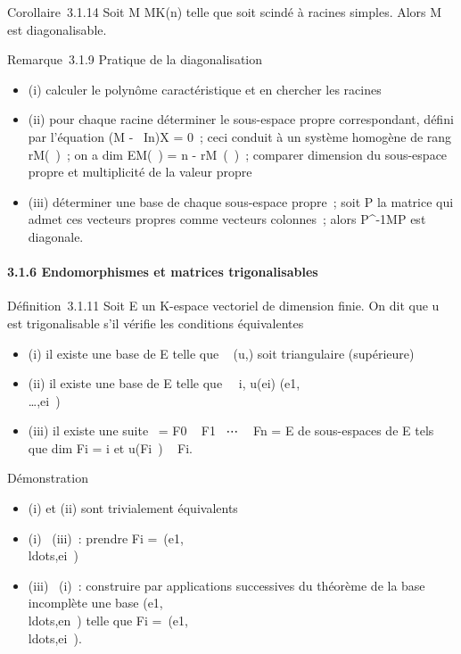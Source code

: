 Corollaire~3.1.14 Soit M \in MK(n) telle que \chiM soit
scindé à racines simples. Alors M est diagonalisable.

Remarque~3.1.9 Pratique de la diagonalisation

\begin{itemize}
\itemsep1pt\parskip0pt
\item
  (i) calculer le polynôme caractéristique et en chercher les racines
\item
  (ii) pour chaque racine déterminer le sous-espace propre
  correspondant, défini par l'équation (M - \lambda~In)X = 0~; ceci
  conduit à un système homogène de rang rM(\lambda~)~; on a
  dim EM(\lambda~) = n - rM~(\lambda~)~;
  comparer dimension du sous-espace propre et multiplicité de la valeur
  propre
\item
  (iii) déterminer une base de chaque sous-espace propre~; soit P la
  matrice qui admet ces vecteurs propres comme vecteurs colonnes~; alors
  P^-1MP est diagonale.
\end{itemize}

\paragraph{3.1.6 Endomorphismes et matrices trigonalisables}

Définition~3.1.11 Soit E un K-espace vectoriel de dimension finie. On
dit que u est trigonalisable s'il vérifie les conditions équivalentes

\begin{itemize}
\itemsep1pt\parskip0pt
\item
  (i) il existe une base  de E telle que
  \mathrmMat~ (u,) soit
  triangulaire (supérieure)
\item
  (ii) il existe une base  de E telle que \forall~~i,
  u(ei)
  \in\mathrmVect(e1,\\\ldots,ei~)
\item
  (iii) il existe une suite \0\ =
  F0 \subset~ F1 \subset~⋯ \subset~
  Fn = E de sous-espaces de E tels que
  dim Fi = i et u(Fi~) \subset~
  Fi.
\end{itemize}

Démonstration

\begin{itemize}
\itemsep1pt\parskip0pt
\item
  (i) et (ii) sont trivialement équivalents
\item
  (i) \rigtharrow~(iii)~: prendre Fi =\
  \mathrmVect(e1,\\ldots,ei~)
\item
  (iii) \rigtharrow~(i)~: construire par applications successives du théorème de la
  base incomplète une base
  (e1,\\ldots,en~)
  telle que Fi =\
  \mathrmVect(e1,\\ldots,ei~).
\end{itemize}

